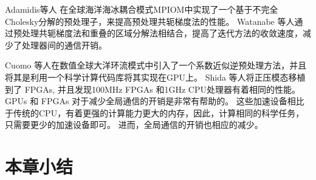 Adamidis等人\cite{adamidis2011high} 在全球海洋海冰耦合模式MPIOM中实现了一个基于不完全 Cholesky分解的预处理子，来提高预处理共轭梯度法的性能。 
Watanabe \cite{Watanabe2006pcg} 等人通过预处理共轭梯度法和重叠的区域分解法相结合，提高了迭代方法的收敛速度，减少了处理器间的通信开销。 

 

Cuomo  \cite{cuomo2012pcg} 等人在数值全球大洋环流模式中引入了一个系数近似逆预处理方法，并且将其是利用一个科学计算代码库将其实现在GPU上。
Shida  \cite{Shida2007}等人将正压模态移植到了 FPGAs, 并且发现100MHz FPGAs 和1GHz CPU处理器有着相同的性能。 
GPUs 和 FPGAs 对于减少全局通信的开销是非常有帮助的。
这些加速设备相比于传统的CPU，有着更强的计算能力更大的内存，因此，计算相同的科学任务，只需要更少的加速设备即可。 进而，全局通信的开销也相应的减少。 

\section{本章小结}
\label{related:Conclude}